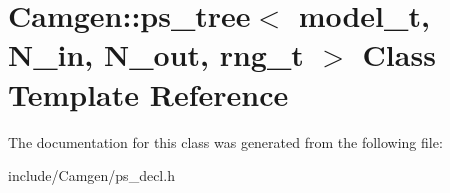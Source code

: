 \hypertarget{a00445}{\section{Camgen\-:\-:ps\-\_\-tree$<$ model\-\_\-t, N\-\_\-in, N\-\_\-out, rng\-\_\-t $>$ Class Template Reference}
\label{a00445}
}


The documentation for this class was generated from the following file\-:\begin{DoxyCompactItemize}
\item 
include/\-Camgen/ps\-\_\-decl.\-h\end{DoxyCompactItemize}
